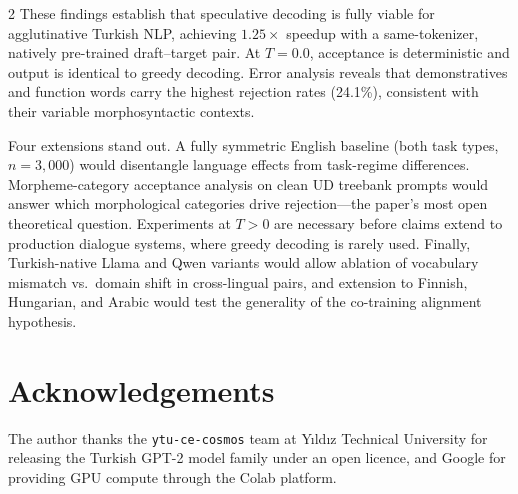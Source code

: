 \documentclass[11pt,a4paper]{article}
\begin{document}
\begin{multicols}{2}
These findings establish that speculative decoding is fully viable for
agglutinative Turkish NLP, achieving $1.25\!\times$ speedup with a
same-tokenizer, natively pre-trained draft--target pair.
At $T=0.0$, acceptance is deterministic and output is identical to
greedy decoding.
Error analysis reveals that demonstratives and function words carry the
highest rejection rates (24.1\%), consistent with their variable
morphosyntactic contexts.

Four extensions stand out.
A fully symmetric English baseline (both task types, $n=3{,}000$) would
disentangle language effects from task-regime differences.
Morpheme-category acceptance analysis on clean UD treebank prompts would
answer which morphological categories drive rejection—the paper's most
open theoretical question.
Experiments at $T > 0$ are necessary before claims extend to production
dialogue systems, where greedy decoding is rarely used.
Finally, Turkish-native Llama and Qwen variants would allow ablation of
vocabulary mismatch vs.\ domain shift in cross-lingual pairs, and
extension to Finnish, Hungarian, and Arabic would test the generality of
the co-training alignment hypothesis.

\section*{Acknowledgements}
The author thanks the \texttt{ytu-ce-cosmos} team at Y{\i}ld{\i}z
Technical University for releasing the Turkish GPT-2 model family under
an open licence, and Google for providing GPU compute through the Colab
platform.

\end{multicols}


\end{document}

